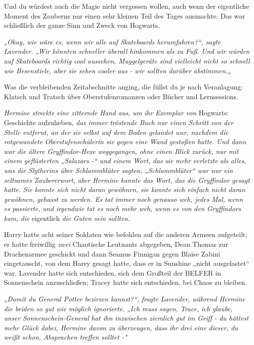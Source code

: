 {Und du würdest auch die Magie nicht vergessen wollen, auch wenn der eigentliche Moment des Zauberns nur einen sehr kleinen Teil des Tages ausmachte. Das war schließlich der ganze Sinn und Zweck von Hogwarts.

\emph{\emph{„Okay, wie wäre es, wenn wir alle auf Skateboards herumfahren?“, sagte Lavender. „Wir könnten schneller überall hinkommen als zu Fuß. Und wir würden auf Skateboards richtig cool aussehen, Muggelgeräte sind vielleicht nicht so schnell wie Besenstiele, aber sie sehen cooler aus - wir sollten darüber abstimmen.„}}

Was die verbleibenden Zeitabschnitte anging, die füllst du je nach Veranlagung: Klatsch und Tratsch über Oberstufenromanzen oder Bücher und Lernsessions.

\emph{Hermine streckte eine zitternde Hand aus, um ihr Exemplar von} Hogwarts: Geschichte aufzuheben, \emph{das immer tröstende Buch nur einen Schritt von der Stelle entfernt, an der sie selbst auf dem Boden gelandet war, nachdem die rotgewandete Oberstufenschülerin sie gegen eine Wand gestoßen hatte. Und dann war die ältere Gryffindor-Hexe weggegangen, ohne einen Blick zurück, nur mit einem geflüsterten „Salazars -“ und einem Wort, das sie mehr verletzte als alles, was die Slytherins über Schlammblüter sagten, „Schlammblüter“ war nur} \emph{ein seltsames Zaubererwort, aber Hermine kannte das Wort, das die Gryffindor gesagt hatte. Sie konnte sich nicht daran gewöhnen, sie konnte sich einfach nicht daran gewöhnen, gehasst zu werden. Es tat immer noch genauso weh, jedes Mal, wenn es passierte, und irgendwie tat es noch mehr weh, wenn es von den Gryffindors kam, die} eigentlich \emph{die Guten sein sollten.}

Harry hatte acht seiner Soldaten wie befohlen auf die anderen Armeen aufgeteilt; er hatte freiwillig \emph{zwei} Chaotische Leutnants abgegeben, Dean Thomas zur Drachenarmee geschickt und dann Seamus Finnigan gegen Blaise Zabini eingetauscht, von dem Harry gesagt hatte, dass er in Sunshine „nicht ausgelastet“ war. Lavender hatte sich entschieden, sich dem Großteil der BELFER in Sonnenschein anzuschließen; Tracey hatte sich entschieden, bei Chaos zu bleiben.

\emph{\emph{„Damit du General Potter bezirzen kannst?“, fragte Lavender, während Hermine die beiden so gut wie möglich ignorierte. „Ich muss sagen, Trace, ich glaube, unser Sonnenschein-General hat ihn inzwischen ziemlich gut im Griff - du hättest mehr Glück dabei, Hermine davon zu überzeugen, dass ihr drei eine dieser, du weißt schon, Absprachen treffen solltet -"}}

}
